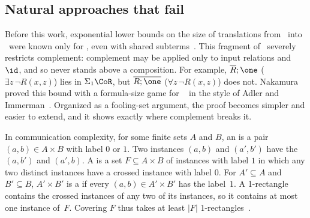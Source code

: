 \subsection{Natural approaches that fail}\label{sec:natural-approaches}
Before this work, exponential lower bounds on the size of translations
from \FOthree\ into \CoR\ were known only for , even
with shared subterms~\citep[Theorems~6.1 and~6.12]{nakamura2022}. This
fragment of \CoR\ severely restricts complement: complement may be
applied only to input relations and $\id$, and so never stands above a
composition. For example, $\overline R;\one$ ($\exists z\,\neg R(x,z)$)
lies in $\Sigma_1\CoR$, but $\overline{R;\one}$
($\forall z\,\neg R(x,z)$) does not. Nakamura proved this bound with a
formula-size game for \CoR~\citep[\S4]{nakamura2022} in the style of
Adler and Immerman~\citep{adler-immerman2003}. Organized
as a fooling-set argument, the proof becomes simpler and easier to
extend, and it shows exactly where complement breaks it.

In communication complexity,
for some finite sets $A$ and $B$,
an  is a pair $(a,b) \in A \times B$ with label $0$ or $1$.
Two instances $(a,b)$ and $(a',b')$ have the  $(a,b')$ and $(a',b)$. A  is a set $F \subseteq A \times B$ of instances with label $1$ in which any two distinct instances have a crossed instance with label $0$.
For $A' \subseteq A$ and $B' \subseteq B$,
$A'\times B'$ is a 
if every $(a, b) \in A' \times B'$ has the label~$1$.
A 1\nobreakdash-rectangle contains the crossed instances of
any two of its instances, so it contains at most one instance of~$F$. Covering
$F$ thus takes at least $|F|$ 1\nobreakdash-rectangles~\citep{yao1979,lipton-sedgewick1981,kushilevitz-nisan1997,rao-yehudayoff2020}.

